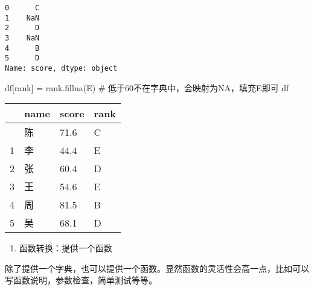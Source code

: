 \documentclass[
  letterpaper,
  DIV=11,
  numbers=noendperiod]{scrreprt}
\newenvironment{Shaded}{\begin{snugshade}}{\end{snugshade}}
\newcommand{\CommentTok}[1]{\textcolor[rgb]{0.37,0.37,0.37}{#1}}
\newcommand{\NormalTok}[1]{\textcolor[rgb]{0.00,0.23,0.31}{#1}}
\newcommand{\OperatorTok}[1]{\textcolor[rgb]{0.37,0.37,0.37}{#1}}
\newcommand{\StringTok}[1]{\textcolor[rgb]{0.13,0.47,0.30}{#1}}
\providecommand{\tightlist}{%
  \setlength{\itemsep}{0pt}\setlength{\parskip}{0pt}}\usepackage{longtable,booktabs,array}
\begin{document}
\begin{verbatim}
0      C
1    NaN
2      D
3    NaN
4      B
5      D
Name: score, dtype: object
\end{verbatim}

\begin{Shaded}
\begin{Highlighting}[]
\NormalTok{df[}\StringTok{\textquotesingle{}rank\textquotesingle{}}\NormalTok{] }\OperatorTok{=}\NormalTok{ rank.fillna(}\StringTok{\textquotesingle{}E\textquotesingle{}}\NormalTok{) }\CommentTok{\# 低于60不在字典中，会映射为NA，填充\textquotesingle{}E\textquotesingle{}即可}
\NormalTok{df}
\end{Highlighting}
\end{Shaded}

\begin{longtable}[]{@{}llll@{}}
\toprule\noalign{}
& name & score & rank \\
\midrule\noalign{}
\endhead
\bottomrule\noalign{}
\endlastfoot
0 & 陈 & 71.6 & C \\
1 & 李 & 44.4 & E \\
2 & 张 & 60.4 & D \\
3 & 王 & 54.6 & E \\
4 & 周 & 81.5 & B \\
5 & 吴 & 68.1 & D \\
\end{longtable}

\begin{enumerate}
\def\labelenumi{\arabic{enumi}.}
\setcounter{enumi}{1}
\tightlist
\item
  函数转换：提供一个函数
\end{enumerate}

除了提供一个字典，也可以提供一个函数。显然函数的灵活性会高一点，比如可以写函数说明，参数检查，简单测试等等。
\end{document}
